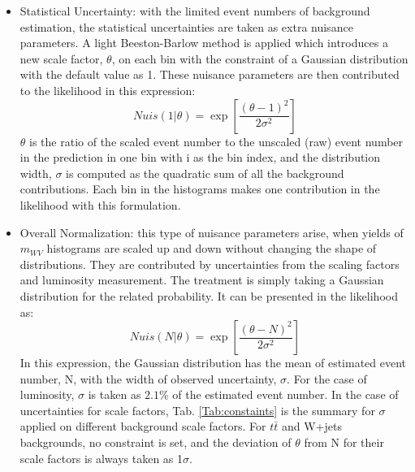 \begin{itemize}
	\item Statistical Uncertainty: with the limited event numbers of background estimation, the statistical uncertainties are taken as extra nuisance parameters. A light Beeston-Barlow method is applied which introduces a new scale factor, $\theta$, on each bin with the constraint of a Gaussian distribution with the default value as 1. These nuisance parameters are then contributed to the likelihood in this expression:
	\begin{equation}
	Nuis(1|\theta) = \exp{\left[\frac{(\theta-1)^2}{2\sigma^{2}}\right]}
	\end{equation} 
	$\theta$ is the ratio of the scaled event number to the unscaled (raw) event number in the prediction in one bin with i as the bin index, and the distribution width, $\sigma$ is computed as the quadratic sum of all the background contributions. Each bin in the histograms makes one contribution in the likelihood with this formulation.
 
	\item Overall Normalization: this type of nuisance parameters arise, when yields of $m_{WV}$ histograms are scaled up and down without changing the shape of distributions. They are contributed by uncertainties from the scaling factors and luminosity measurement. The treatment is simply taking a Gaussian distribution for the related probability. It can be presented in the likelihood as:
	\begin{equation}
	Nuis(N|\theta)=\exp\left[\frac{(\theta-N)^2}{2\sigma^2}\right]
	\end{equation}
	In this expression, the Gaussian distribution has the mean of estimated event number, N, with the width of observed uncertainty, $\sigma$. For the case of luminosity, $\sigma$ is taken as $2.1\%$ of the estimated event number. In the case of uncertainties for scale factors, Tab. \ref{Tab:constaints} is the summary for $\sigma$ applied on different background scale factors. For $t\bar{t}$ and W+jets backgrounds, no constraint is set, and the deviation of $\theta$ from N for their scale factors is always taken as 1$\sigma$.  
	

\end{itemize}
